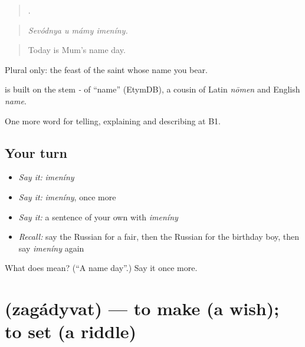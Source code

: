 \begin{quote}
   .
\end{quote}

\begin{quote}
\emph{Sevódnya u mámy imeníny.}
\end{quote}

\begin{quote}
Today is Mum's name day.
\end{quote}

Plural only: the feast of the saint whose name you bear.

\begin{cousinweb}
\emph{} is built on the stem \emph{-} of \emph{} \textquotedblleft{}name\textquotedblright{} (EtymDB), a cousin of Latin \emph{nōmen} and English \emph{name}.
\end{cousinweb}

\begin{grammarlens}[title={What you've built}]
One more word for telling, explaining and describing at B1.
\end{grammarlens}

\subsection*{Your turn}
\begin{itemize}
\raggedright
  \item \emph{Say it:} \emph{imeníny}
  \item \emph{Say it:} \emph{imeníny}, once more
  \item \emph{Say it:} a sentence of your own with \emph{imeníny}
  \item \emph{Recall:} say the Russian for a fair, then the Russian for the birthday boy, then say \emph{imeníny} again
\end{itemize}

\begin{tcolorbox}[breakable,colback=teal!4,colframe=teal!35!black,title={Before you move on}]
What does  mean? (\textquotedblleft{}A name day\textquotedblright{}.) Say it once more.
\end{tcolorbox}
\section[\texorpdfstring{\ru{загадывать} (zagádyvat)}{загадывать (zagádyvat)}]{ (zagádyvat) — to make (a wish); to set (a riddle)}

